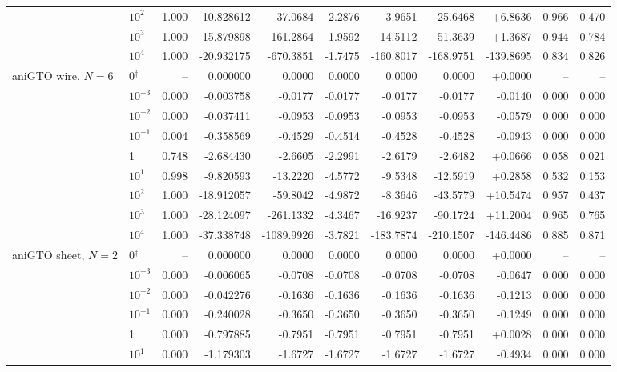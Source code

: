 \begin{tabular}{@{}llr rrrrrr rr@{}}
 & $10^{2}$ & 1.000 & -10.828612 & -37.0684 & -2.2876 & -3.9651 & -25.6468 & +6.8636 & 0.966 & 0.470 \\
 & $10^{3}$ & 1.000 & -15.879898 & -161.2864 & -1.9592 & -14.5112 & -51.3639 & +1.3687 & 0.944 & 0.784 \\
 & $10^{4}$ & 1.000 & -20.932175 & -670.3851 & -1.7475 & -160.8017 & -168.9751 & -139.8695 & 0.834 & 0.826 \\
\addlinespace
aniGTO wire, $N=6$ & 0$^{\dagger}$ & -- & 0.000000 & 0.0000 & 0.0000 & 0.0000 & 0.0000 & +0.0000 & -- & -- \\
 & $10^{-3}$ & 0.000 & -0.003758 & -0.0177 & -0.0177 & -0.0177 & -0.0177 & -0.0140 & 0.000 & 0.000 \\
 & $10^{-2}$ & 0.000 & -0.037411 & -0.0953 & -0.0953 & -0.0953 & -0.0953 & -0.0579 & 0.000 & 0.000 \\
 & $10^{-1}$ & 0.004 & -0.358569 & -0.4529 & -0.4514 & -0.4528 & -0.4528 & -0.0943 & 0.000 & 0.000 \\
 & 1 & 0.748 & -2.684430 & -2.6605 & -2.2991 & -2.6179 & -2.6482 & +0.0666 & 0.058 & 0.021 \\
 & $10^{1}$ & 0.998 & -9.820593 & -13.2220 & -4.5772 & -9.5348 & -12.5919 & +0.2858 & 0.532 & 0.153 \\
 & $10^{2}$ & 1.000 & -18.912057 & -59.8042 & -4.9872 & -8.3646 & -43.5779 & +10.5474 & 0.957 & 0.437 \\
 & $10^{3}$ & 1.000 & -28.124097 & -261.1332 & -4.3467 & -16.9237 & -90.1724 & +11.2004 & 0.965 & 0.765 \\
 & $10^{4}$ & 1.000 & -37.338748 & -1089.9926 & -3.7821 & -183.7874 & -210.1507 & -146.4486 & 0.885 & 0.871 \\
\addlinespace
aniGTO sheet, $N=2$ & 0$^{\dagger}$ & -- & 0.000000 & 0.0000 & 0.0000 & 0.0000 & 0.0000 & +0.0000 & -- & -- \\
 & $10^{-3}$ & 0.000 & -0.006065 & -0.0708 & -0.0708 & -0.0708 & -0.0708 & -0.0647 & 0.000 & 0.000 \\
 & $10^{-2}$ & 0.000 & -0.042276 & -0.1636 & -0.1636 & -0.1636 & -0.1636 & -0.1213 & 0.000 & 0.000 \\
 & $10^{-1}$ & 0.000 & -0.240028 & -0.3650 & -0.3650 & -0.3650 & -0.3650 & -0.1249 & 0.000 & 0.000 \\
 & 1 & 0.000 & -0.797885 & -0.7951 & -0.7951 & -0.7951 & -0.7951 & +0.0028 & 0.000 & 0.000 \\
 & $10^{1}$ & 0.000 & -1.179303 & -1.6727 & -1.6727 & -1.6727 & -1.6727 & -0.4934 & 0.000 & 0.000 \\

\end{tabular}
